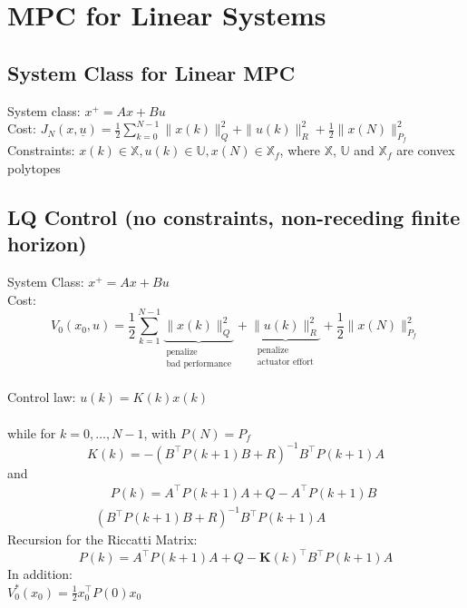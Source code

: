 \documentclass[english]{latex4ei/latex4ei_sheet}
\begin{document}
\newpage
\section{MPC for Linear Systems}
\begin{sectionbox}

\subsection{System Class for Linear MPC}
System class: $x^{+}=A x+B u$ \\
Cost: $J_{N}(x, \underline{u})=\frac{1}{2} \sum\limits_{k=0}^{N-1}\|x(k)\|_{Q}^{2}+\|u(k)\|_{R}^{2}+\frac{1}{2}\|x(N)\|_{P_{f}}^{2}$ \\
Constraints: $x(k) \in \mathbb{X}, u(k) \in \mathbb{U}, x(N) \in \mathbb{X}_{f}$, where $\mathbb{X}$, $\mathbb{U}$ and $\mathbb{X}_{f}$ are convex polytopes

\subsection{LQ Control (no constraints, non-receding finite horizon)}
System Class: $x^{+}=A x+B u$ \\
Cost: $$V_{0}\left(x_{0}, u\right)=\frac{1}{2} \sum_{k=1}^{N-1}\underbrace{\|x(k)\|_{Q}^{2}}_{\substack{\text{penalize} \\ \text{bad performance}}}+\underbrace{\|u(k)\|_{R}^{2}}_{\substack{\text{penalize} \\ \text{actuator effort}}}+\frac{1}{2}\|x(N)\|_{P_{f}}^{2}$$ \\
Control law: $u(k)=K(k) x(k)$ \\
\\
while for $k=0, \ldots, N-1$, with $P(N)=P_{f}$
$$K(k)=-\left(B^{\top} P(k+1) B+R\right)^{-1} B^{\top} P(k+1) A$$ and
\begin{multline*}
    \quad\ P(k)=A^{\top} P(k+1) A+Q-A^{\top} P(k+1) B\\\left(B^{\top} P(k+1) B+R\right)^{-1} B^{\top} P(k+1) A
\end{multline*}
Recursion for the Riccatti Matrix:
$$P(k)=A^{\top} P(k+1) A+Q-\boldsymbol{K}(k)^{\top}B^{\top} P(k+1)A$$
In addition:\\ 
$V_{0}^{*}\left(x_{0}\right)=\frac{1}{2} x_{0}^{\top} P(0) x_{0}$\\


\end{sectionbox}
\end{document}
